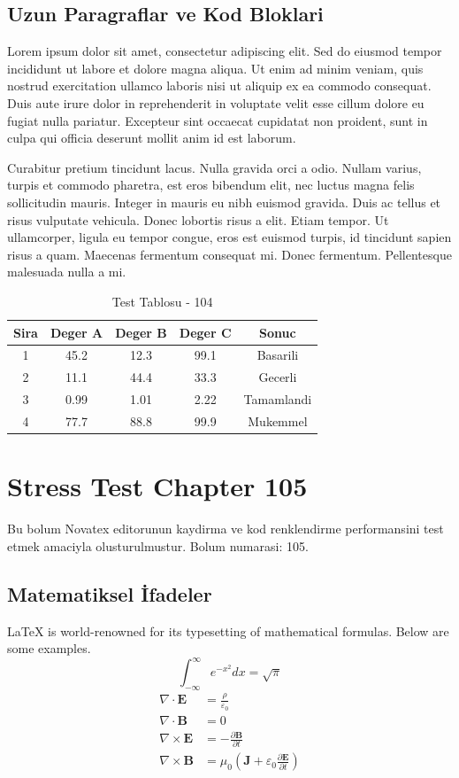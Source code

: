 \documentclass[12pt,a4paper]{article}
\begin{document}
\subsection{Uzun Paragraflar ve Kod Bloklari}
Lorem ipsum dolor sit amet, consectetur adipiscing elit. Sed do eiusmod tempor incididunt ut labore et dolore magna aliqua. Ut enim ad minim veniam, quis nostrud exercitation ullamco laboris nisi ut aliquip ex ea commodo consequat. Duis aute irure dolor in reprehenderit in voluptate velit esse cillum dolore eu fugiat nulla pariatur. Excepteur sint occaecat cupidatat non proident, sunt in culpa qui officia deserunt mollit anim id est laborum.

Curabitur pretium tincidunt lacus. Nulla gravida orci a odio. Nullam varius, turpis et commodo pharetra, est eros bibendum elit, nec luctus magna felis sollicitudin mauris. Integer in mauris eu nibh euismod gravida. Duis ac tellus et risus vulputate vehicula. Donec lobortis risus a elit. Etiam tempor. Ut ullamcorper, ligula eu tempor congue, eros est euismod turpis, id tincidunt sapien risus a quam. Maecenas fermentum consequat mi. Donec fermentum. Pellentesque malesuada nulla a mi.

\begin{table}[h!]
\centering
\begin{tabular}{|c|c|c|c|c|}
\hline
\textbf{Sira} & \textbf{Deger A} & \textbf{Deger B} & \textbf{Deger C} & \textbf{Sonuc} \\
\hline
1 & 45.2 & 12.3 & 99.1 & Basarili \\
2 & 11.1 & 44.4 & 33.3 & Gecerli \\
3 & 0.99 & 1.01 & 2.22 & Tamamlandi \\
4 & 77.7 & 88.8 & 99.9 & Mukemmel \\
\hline
\end{tabular}
\caption{Test Tablosu - 104}
\end{table}

\newpage
\section{Stress Test Chapter 105}
Bu bolum Novatex editorunun kaydirma ve kod renklendirme performansini test etmek amaciyla olusturulmustur. Bolum numarasi: 105.

\subsection{Matematiksel İfadeler}
\LaTeX{} is world-renowned for its typesetting of mathematical formulas. Below are some examples.
\begin{equation}
\int_{-\infty}^{\infty} e^{-x^2} dx = \sqrt{\pi}
\end{equation}
\begin{align}
\nabla \cdot \mathbf{E} &= \frac{\rho}{\varepsilon_0} \\
\nabla \cdot \mathbf{B} &= 0 \\
\nabla \times \mathbf{E} &= -\frac{\partial \mathbf{B}}{\partial t} \\
\nabla \times \mathbf{B} &= \mu_0\left(\mathbf{J} + \varepsilon_0 \frac{\partial \mathbf{E}}{\partial t}\right)
\end{align}
\end{document}
